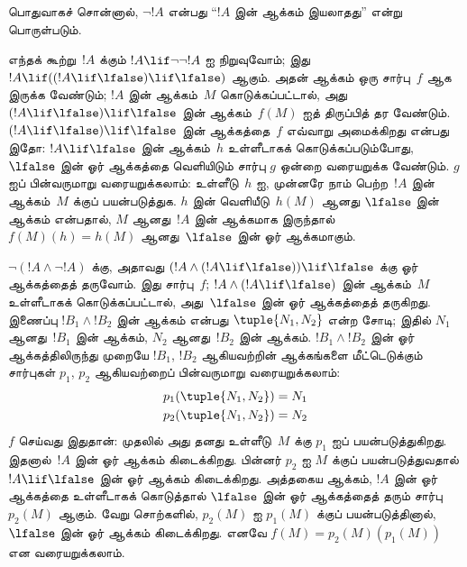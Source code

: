 \documentclass[../../../include/open-logic-section]{subfiles}
\begin{document}
பொதுவாகச் சொன்னால், $\lnot !A$ என்பது ``$!A$ இன் ஆக்கம் இயலாதது'' என்று
பொருள்படும்.

\begin{ex}
எந்தக் கூற்று~$!A$ க்கும் $!A \lif \lnot \lnot !A$ ஐ நிறுவுவோம்; இது
$!A \lif ((!A \lif \lfalse) \lif \lfalse)$ ஆகும். அதன் ஆக்கம் ஒரு
சார்பு~$f$ ஆக இருக்க வேண்டும்; $!A$ இன் ஆக்கம்~$M$ கொடுக்கப்பட்டால், அது
$(!A \lif \lfalse) \lif \lfalse$ இன் ஆக்கம்~$f(M)$ ஐத் திருப்பித் தர
வேண்டும். $(!A \lif \lfalse) \lif \lfalse$ இன் ஆக்கத்தை~$f$ எவ்வாறு
அமைக்கிறது என்பது இதோ: $!A \lif \lfalse$ இன் ஆக்கம்~$h$ உள்ளீடாகக்
கொடுக்கப்படும்போது, $\lfalse$ இன் ஓர் ஆக்கத்தை வெளியிடும் சார்பு $g$ ஒன்றை
வரையறுக்க வேண்டும். $g$ ஐப் பின்வருமாறு வரையறுக்கலாம்: உள்ளீடு~$h$ ஐ,
முன்னரே நாம் பெற்ற~$!A$ இன் ஆக்கம்~$M$ க்குப் பயன்படுத்துக. $h$ இன்
வெளியீடு~$h(M)$ ஆனது $\lfalse$ இன் ஆக்கம் என்பதால், $M$ ஆனது~$!A$ இன்
ஆக்கமாக இருந்தால் $f(M)(h) = h(M)$ ஆனது~$\lfalse$ இன் ஓர் ஆக்கமாகும்.
\end{ex}

\begin{ex}
$\lnot(!A \land \lnot !A)$ க்கு, அதாவது $(!A \land (!A \lif
\lfalse)) \lif \lfalse$ க்கு ஓர் ஆக்கத்தைத் தருவோம். இது சார்பு~$f$;
$!A \land (!A \lif \lfalse)$ இன் ஆக்கம்~$M$ உள்ளீடாகக் கொடுக்கப்பட்டால்,
அது~$\lfalse$ இன் ஓர் ஆக்கத்தைத் தருகிறது. இணைப்பு $!B_1 \land !B_2$ இன்
ஆக்கம் என்பது $\tuple{N_1, N_2}$ என்ற சோடி; இதில் $N_1$ ஆனது~$!B_1$ இன்
ஆக்கம், $N_2$ ஆனது~$!B_2$ இன் ஆக்கம். $!B_1 \land !B_2$ இன் ஓர்
ஆக்கத்திலிருந்து முறையே $!B_1$, $!B_2$ ஆகியவற்றின் ஆக்கங்களை மீட்டெடுக்கும்
சார்புகள் $p_1$, $p_2$ ஆகியவற்றைப் பின்வருமாறு வரையறுக்கலாம்:
\begin{align*}
  p_1(\tuple{N_1, N_2}) &= N_1\\
  p_2(\tuple{N_1, N_2}) &= N_2
\end{align*}
$f$ செய்வது இதுதான்: முதலில் அது தனது உள்ளீடு~$M$ க்கு $p_1$ ஐப்
பயன்படுத்துகிறது. இதனால்~$!A$ இன் ஓர் ஆக்கம் கிடைக்கிறது. பின்னர் $p_2$ ஐ
$M$ க்குப் பயன்படுத்துவதால் $!A \lif \lfalse$ இன் ஓர் ஆக்கம் கிடைக்கிறது.
அத்தகைய ஆக்கம், $!A$ இன் ஓர் ஆக்கத்தை உள்ளீடாகக் கொடுத்தால் $\lfalse$ இன்
ஓர் ஆக்கத்தைத் தரும் சார்பு~$p_2(M)$ ஆகும். வேறு சொற்களில், $p_2(M)$ ஐ
$p_1(M)$ க்குப் பயன்படுத்தினால், $\lfalse$ இன் ஓர் ஆக்கம் கிடைக்கிறது.
எனவே $f(M) = p_2(M)(p_1(M))$ என வரையறுக்கலாம்.
\end{ex}
\end{document}
